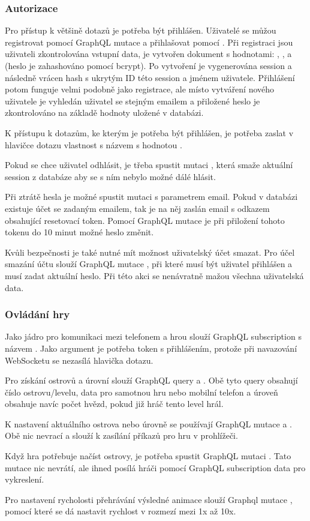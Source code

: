\subsubsection{Autorizace}
Pro přístup k většině dotazů je potřeba být přihlášen. Uživatelé se můžou registrovat pomocí GraphQL mutace  a přihlašovat pomocí . Při registraci jsou uživateli zkontrolována vstupní data, je vytvořen dokument s hodnotami: , ,  a  (heslo je zahashováno pomocí bcrypt\cite{bcrypt}). Po vytvoření je vygenerována session a následně vrácen hash s ukrytým ID této session a jménem uživatele. Přihlášení potom funguje velmi podobně jako registrace, ale místo vytváření nového uživatele je vyhledán uživatel se stejným emailem a přiložené heslo je zkontrolováno na základě hodnoty uložené v databázi.\par
K přístupu k dotazům, ke kterým je potřeba být přihlášen, je potřeba zaslat v hlavičce dotazu vlastnost s názvem  s hodnotou .\par
Pokud se chce uživatel odhlásit, je třeba spustit mutaci , která smaže aktuální session z databáze aby se s ním nebylo možné dálé hlásit.\par
Při ztrátě hesla je možné spustit mutaci  s parametrem email. Pokud v databázi existuje účet se zadaným emailem, tak je na něj zaslán email s odkazem obsahující resetovací token. Pomocí GraphQL mutace  je při přiložení tohoto tokenu do 10 minut možné heslo změnit.\par
Kvůli bezpečnosti je také nutné mít možnost uživatelský účet smazat. Pro účel smazání účtu slouží GraphQL mutace , při které musí být uživatel přihlášen a musí zadat aktuální heslo. Při této akci se nenávratně mažou všechna uživatelská data.

\subsubsection{Ovládání hry}
Jako jádro pro komunikaci mezi telefonem a hrou slouží GraphQL subscription s názvem . Jako argument je potřeba token s přihlášením, protože při navazování WebSocketu se nezasílá hlavička dotazu.\par
Pro získání ostrovů a úrovní slouží GraphQL query  a . Obě tyto query obsahují číslo ostrovu/levelu, data pro samotnou hru nebo mobilní telefon a úroveň obsahuje navíc počet hvězd, pokud již hráč tento level hrál.\par
K nastavení aktuálního ostrova nebo úrovně se používají GraphQL mutace  a . Obě nic nevrací a slouží k zasílání příkazů pro hru v prohlížeči.\par
Když hra potřebuje načíst ostrovy, je potřeba spustit GraphQL mutaci . Tato mutace nic nevrátí, ale ihned posílá hráči pomocí GraphQL subscription data pro vykreslení.\par
Pro nastavení rycholosti přehrávání výsledné animace slouží Graphql mutace , pomocí které se dá nastavit rychlost v rozmezí mezi 1x až 10x.

